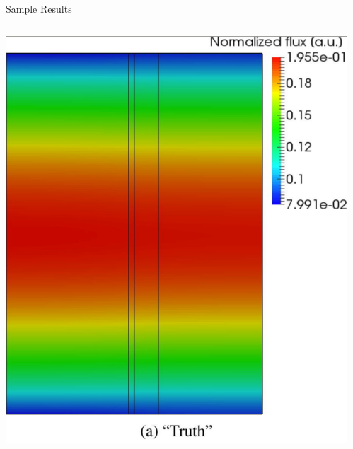 \documentclass{beamer}
\begin{document}
\begin{frame}{Sample Results}
   \begin{columns}
        \begin{column}{0.5\textwidth}
            \begin{center}
                \includegraphics[width=\textwidth]{1.pdf}
            \end{center}
        \end{column}
        \begin{column}{0.5\textwidth} 
            \begin{center}

\end{center}
\end{column}
\end{columns}
\end{frame}
\end{document}
